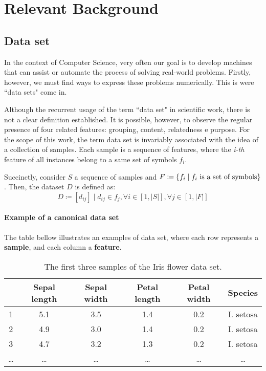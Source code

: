 \chapter{Relevant Background}
\section{Data set}

In the context of Computer Science, very often our goal is to develop machines that can assist or automate the process of solving real-world problems. Firstly, however, we must find ways to express these problems numerically. This is were ``data sets" come in.

Although the recurrent usage of the term ``data set" in scientific work, there is not a clear definition established. It is possible, however, to observe the regular presence of four related features: grouping, content, relatedness e purpose. \cite{ren2010}
For the scope of this work, the term data set is invariably associated with the idea of a collection of samples. Each sample is a sequence of features, where the {\em i-th} feature of all instances belong to a same set of symbols $f_i$.

Succinctly, consider $S$ a sequence of samples and
$F \coloneqq  \{f_i \mid f_i \textnormal{ is a set of symbols}\}$. Then, the dataset $D$ is defined as:
$$D\coloneqq [d_{ij}] \mid d_{ij} \in f_j, \forall i \in [1, |S|], \forall j \in [1, |F|]$$

\subsubsection{Example of a canonical data set} \label{irisdataset}

The table bellow illustrates an examples of data set, where each row represents a \textbf{sample}, and each column a \textbf{feature}.

\begin{table}[H]
	\begin{tabular}{ c || *{5}{c|}}
		& \textbf{Sepal length} & \textbf{Sepal width} & \textbf{Petal length} & \textbf{Petal width} & \textbf{Species} \\
		\hline
		1 & 5.1	& 3.5 & 1.4 & 0.2 & I. setosa \\
		2 & 4.9 & 3.0 & 1.4 & 0.2 & I. setosa \\
		3 & 4.7 & 3.2 & 1.3 & 0.2 & I. setosa \\
		… & … & … & … & … & … \\
	\end{tabular}
	\caption{The first three samples of the Iris flower data set.}
\end{table}


